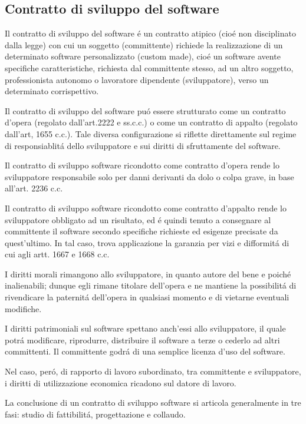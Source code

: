 \documentclass{article}
\begin{document}
\subsection{Contratto di sviluppo del software}
Il contratto di sviluppo del software \'e un contratto atipico (cio\'e non disciplinato dalla legge) con cui un soggetto (committente) richiede la realizzazione di un determinato software personalizzato (custom made), cio\'e un software avente specifiche caratteristiche, richiesta dal committente stesso, ad un altro soggetto, professionista autonomo o lavoratore dipendente (sviluppatore), verso un determinato corrispettivo. 

Il contratto di sviluppo del software pu\'o essere strutturato come un contratto d'opera (regolato dall'art.2222 e ss.c.c.) o come un contratto di appalto (regolato dall'art, 1655 c.c.). Tale diversa configurazione si riflette direttamente sul regime di responsiablit\'a dello sviluppatore e sui diritti di sfruttamente del software. 

Il contratto di sviluppo software ricondotto come contratto d'opera rende lo sviluppatore responsabile solo per danni derivanti da dolo o colpa grave, in base all'art. 2236 c.c.

Il contratto di sviluppo software ricondotto come contratto d'appalto rende lo sviluppatore obbligato ad un risultato, ed \'e quindi tenuto a consegnare al committente il software secondo specifiche richieste ed esigenze precisate da quest'ultimo. In tal caso, trova applicazione la garanzia per vizi e difformit\'a di cui agli artt. 1667 e 1668 c.c.

I diritti morali rimangono allo sviluppatore, in quanto autore del bene e poich\'e inalienabili; dunque egli rimane titolare dell'opera e ne mantiene la possibilit\'a di rivendicare la paternit\'a dell'opera in qualsiasi momento e di vietarne eventuali modifiche. 

I diritti patrimoniali sul software spettano anch'essi allo sviluppatore, il quale potr\'a modificare, riprodurre, distribuire il software a terze o cederlo ad altri committenti. Il committente godr\'a di una semplice licenza d'uso del software. 

Nel caso, per\'o, di rapporto di lavoro subordinato, tra committente e sviluppatore, i diritti di utilizzazione economica ricadono sul datore di lavoro.

La conclusione di un contratto di sviluppo software si articola generalmente in tre fasi: studio di fattibilit\'a, progettazione e collaudo.
\end{document}
